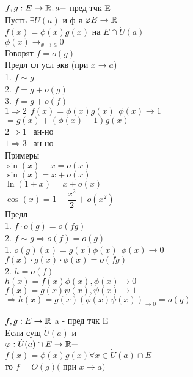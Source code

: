 
$ f,g : E \rightarrow \mathbb{R}, a - $ пред тчк E \\
Пусть $ \exists \dot{U} (a) $ и ф-я $ \varphi E \rightarrow \mathbb{R} $ \\
$ f(x) = \phi(x) g(x) $ на $ E \cap \dot{U} (a) $ \\
$ \phi(x) \rightarrow_{x \rightarrow a} 0 $ \\
Говорят $ f = o(g) $\\
Предл сл усл экв (при $ x \rightarrow a $) \\
1. $ f \sim g $ \\
2. $ f = g + o(g) $\\
3. $ f = g + o(f) $\\
$1 \Rightarrow 2 \ \ f(x)= \phi(x) g(x) \ \ \phi(x) \rightarrow 1 $ \\
$ = g(x) + (\phi(x) - 1)g(x) $ \\
$ 2 \Rightarrow 1 \ \ $ ан-но \\
$ 1 \Rightarrow 3 \ \ $ ан-но \\
Примеры \\
$ \sin(x) - x = o(x) $\\
$ \sin(x) = x + o(x) $ \\
$ \ln(1+x) = x + o(x) $ \\
$ \cos(x) = 1 - \dfrac{x^2}{2} + o(x^2) $ \\
Предл \\
1. $ f \cdot o(g) = o(fg) $ \\
2. $ f \sim g  \Rightarrow o(f) = o(g) $ \\
1. $ o(g) (x) = g(x) \phi(x) \ \ \phi(x) \rightarrow 0 $ \\
$ f(x) \cdot g(x) \cdot \phi(x) = o(fg) $\\
2. $ h= o(f) $ \\
$ h(x) = f(x) \phi(x), \phi(x) \rightarrow 0 $ \\
$ f(x) = g(x) \psi (x), \psi(x) \rightarrow 1 $ \\
$ \Rightarrow h(x) = g(x) (\phi(x) \psi(x))_{\rightarrow 0} = o(g) $

\begin{definition}
	$ f, g : E \rightarrow \mathbb{R} $ a - пред тчк E \\
	Eсли сущ $ \dot{U} (a) $ и \\
	$ \varphi : \dot{U} (a) \cap E \rightarrow \mathbb{R}+ $ \\
	$ f(x) = \phi(x) g(x) \forall x \in \dot{U} (a) \cap E $ \\
	то $ f = O(g) ( $ при $  x \rightarrow a) $ \\
\end{definition}

